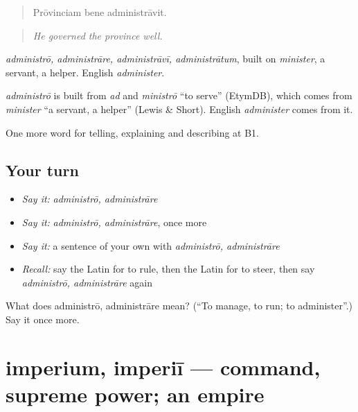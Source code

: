 \begin{quote}
Prōvinciam bene administrāvit.
\end{quote}

\begin{quote}
\emph{He governed the province well.}
\end{quote}

\emph{administrō, administrāre, administrāvī, administrātum}, built on \emph{minister}, a servant, a helper. English \emph{administer}.

\begin{cousinweb}
\emph{administrō} is built from \emph{ad} and \emph{ministrō} \textquotedblleft{}to serve\textquotedblright{} (EtymDB), which comes from \emph{minister} \textquotedblleft{}a servant, a helper\textquotedblright{} (Lewis \& Short). English \emph{administer} comes from it.
\end{cousinweb}

\begin{grammarlens}[title={What you've built}]
One more word for telling, explaining and describing at B1.
\end{grammarlens}

\subsection*{Your turn}
\begin{itemize}
\raggedright
  \item \emph{Say it:} \emph{administrō, administrāre}
  \item \emph{Say it:} \emph{administrō, administrāre}, once more
  \item \emph{Say it:} a sentence of your own with \emph{administrō, administrāre}
  \item \emph{Recall:} say the Latin for to rule, then the Latin for to steer, then say \emph{administrō, administrāre} again
\end{itemize}

\begin{tcolorbox}[breakable,colback=teal!4,colframe=teal!35!black,title={Before you move on}]
What does administrō, administrāre mean? (\textquotedblleft{}To manage, to run; to administer\textquotedblright{}.) Say it once more.
\end{tcolorbox}
\section[imperium, imperiī]{imperium, imperiī — command, supreme power; an empire}

